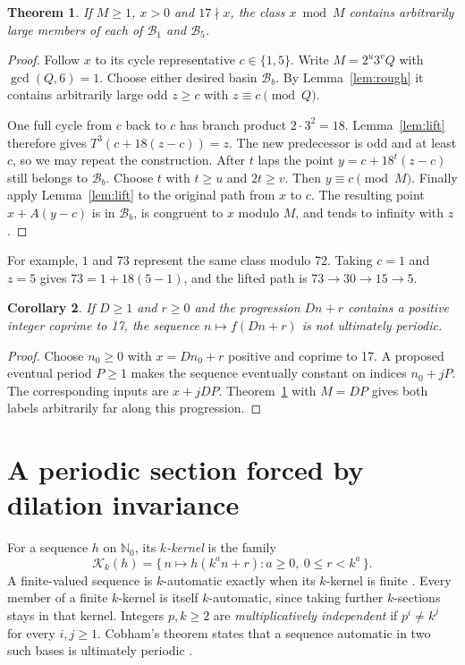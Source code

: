 \documentclass[11pt,a4paper]{article}
\newtheorem{theorem}{Theorem}
\newtheorem{corollary}[theorem]{Corollary}
\newcommand{\NN}{\mathbb N_0}
\newcommand{\B}{\mathcal B}
\newcommand{\K}{\mathcal K}
\begin{document}
\begin{theorem}\label{th:mix}
If $M\ge1$, $x>0$ and $17\nmid x$, the class $x\bmod M$ contains arbitrarily large members of each of $\B_1$ and $\B_5$.
\end{theorem}
\begin{proof}
Follow $x$ to its cycle representative $c\in\{1,5\}$. Write $M=2^u3^vQ$ with $\gcd(Q,6)=1$. Choose either desired basin $\B_b$. By Lemma~\ref{lem:rough} it contains arbitrarily large odd $z\ge c$ with $z\equiv c\pmod Q$.

One full cycle from $c$ back to $c$ has branch product $2\cdot3^2=18$. Lemma~\ref{lem:lift} therefore gives $T^3(c+18(z-c))=z$. The new predecessor is odd and at least $c$, so we may repeat the construction. After $t$ laps the point $y=c+18^t(z-c)$ still belongs to $\B_b$. Choose $t$ with $t\ge u$ and $2t\ge v$. Then $y\equiv c\pmod M$. Finally apply Lemma~\ref{lem:lift} to the original path from $x$ to $c$. The resulting point $x+A(y-c)$ is in $\B_b$, is congruent to $x$ modulo $M$, and tends to infinity with $z$.
\end{proof}

For example, $1$ and $73$ represent the same class modulo 72. Taking $c=1$ and $z=5$ gives $73=1+18(5-1)$, and the lifted path is $73\to30\to15\to5$.

\begin{corollary}\label{cor:aper}
If $D\ge1$ and $r\ge0$ and the progression $Dn+r$ contains a positive integer coprime to 17, the sequence $n\mapsto f(Dn+r)$ is not ultimately periodic.
\end{corollary}
\begin{proof}
Choose $n_0\ge0$ with $x=Dn_0+r$ positive and coprime to 17. A proposed eventual period $P\ge1$ makes the sequence eventually constant on indices $n_0+jP$. The corresponding inputs are $x+jDP$. Theorem~\ref{th:mix} with $M=DP$ gives both labels arbitrarily far along this progression.
\end{proof}

\newpage
\section{A periodic section forced by dilation invariance}
For a sequence $h$ on $\NN$, its \emph{$k$-kernel} is the family
\[
 \K_k(h)=\{\,n\mapsto h(k^a n+r): a\ge0,\ 0\le r<k^a\,\}.
\]
A finite-valued sequence is $k$-automatic exactly when its $k$-kernel is finite \cite[Ch.~6]{AS}. Every member of a finite $k$-kernel is itself $k$-automatic, since taking further $k$-sections stays in that kernel. Integers $p,k\ge2$ are \emph{multiplicatively independent} if $p^i\ne k^j$ for every $i,j\ge1$. Cobham's theorem states that a sequence automatic in two such bases is ultimately periodic \cite{Cobham}.
\end{document}
